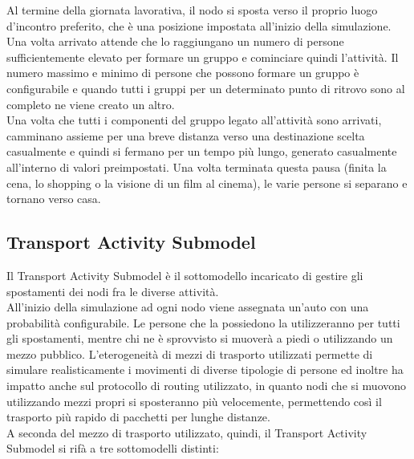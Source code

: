 Al termine della giornata lavorativa, il nodo si sposta verso il proprio luogo d'incontro preferito, che è una posizione impostata all'inizio della simulazione. Una volta arrivato attende che lo raggiungano un numero di persone sufficientemente elevato per formare un gruppo e cominciare quindi l'attività. Il numero massimo e minimo di persone che possono formare un gruppo è configurabile e quando tutti i gruppi per un determinato punto di ritrovo sono al completo ne viene creato un altro.
\\

Una volta che tutti i componenti del gruppo legato all'attività sono arrivati, camminano assieme per una breve distanza verso una destinazione scelta casualmente e quindi si fermano per un tempo più lungo, generato casualmente all'interno di valori preimpostati. Una volta terminata questa pausa (finita la cena, lo shopping o la visione di un film al cinema), le varie persone si separano e tornano verso casa.

\subsection{Transport Activity Submodel}
Il Transport Activity Submodel è il sottomodello incaricato di gestire gli spostamenti dei nodi fra le diverse attività.
\\

All'inizio della simulazione ad ogni nodo viene assegnata un'auto con una probabilità configurabile. Le persone che la possiedono la utilizzeranno per tutti gli spostamenti, mentre chi ne è sprovvisto si muoverà a piedi o utilizzando un mezzo pubblico. L'eterogeneità di mezzi di trasporto utilizzati permette di simulare realisticamente i movimenti di diverse tipologie di persone ed inoltre ha impatto anche sul protocollo di routing utilizzato, in quanto nodi che si muovono utilizzando mezzi propri si sposteranno più velocemente, permettendo così il trasporto più rapido di pacchetti per lunghe distanze.
\\

A seconda del mezzo di trasporto utilizzato, quindi, il Transport Activity Submodel si rifà a tre sottomodelli distinti:
\\

